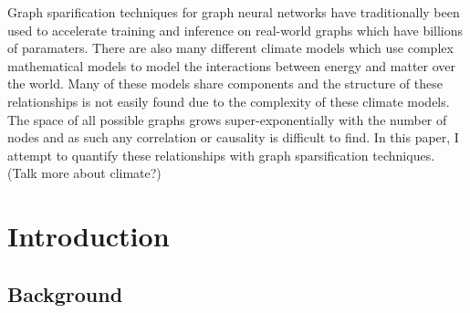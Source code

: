 \documentclass[honours,12pt]{unswthesis}
\newcommand\blankpage{%
    \null
    \thispagestyle{empty}%
    \addtocounter{page}{-1}%
    \newpage}
\numberwithin{equation}{section}
\begin{document}

\afterpage{\blankpage}



Graph sparification techniques for graph neural networks have traditionally been used to 
accelerate training and inference on real-world graphs which have billions of paramaters.
There are also many different climate models which use complex mathematical models to model 
the interactions between energy and matter over the world. Many of these models share 
components and the structure of these relationships is not easily found due to the complexity of
these climate models. The space of all possible graphs grows super-exponentially with the number 
of nodes and as such any correlation or causality is difficult to find. In this paper, I attempt 
to quantify these relationships with graph sparsification techniques.
(Talk more about climate?)
\afterpage{\blankpage}


\afterpreface

%
%

\afterpage{\blankpage}

\chapter{Introduction}\label{s-intro}

{\section{Background}}\label{background}
\end{document}
